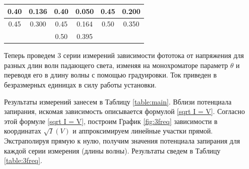 \documentclass[a4paper, 12pt]{article}
\begin{document}
\begin{table}[h]
\begin{tabular}{|cc|cc|cc|}
    0.40                                                      & 0.136                                                  & 0.40                                                     & 0.050                                                 & 0.45                                                     & 0.200                                                  \\ \hline
    0.45                                                      & 0.300                                                  & 0.45                                                     & 0.164                                                 & 0.50                                                     & 0.350                                                  \\ \hline
                                                              &                                                        & 0.50                                                     & 0.395                                                 &                                                          &                                                        \\ \hline
    \end{tabular}
\end{table}
	
	Теперь проведем 3 серии измерений зависимости фототока от напряжения для разных длин волн падающего света, изменяя на монохроматоре параметр $ \theta $ и переводя его в длину волны с помощью градуировки. Ток приведен в безразмерных единицах в силу работы установки. 
	
	Результаты измерений занесем в Таблицу \ref{table:main}. Вблизи потенциала запирания, искомая зависимость описывается формулой \eqref{sqrt I = V}. Согласно этой формуле \eqref{sqrt I = V}, построим График \ref{fig:3freq} зависимости в координатах $ \sqrt{I} (V) $ и аппроксимируем линейные участки прямой. Экстраполируя прямую к нулю, получим значения потенциала запирания для каждой серии измерения (длины волны). Результаты сведем в Таблицу \ref{table:3freq}. 
\end{document}
